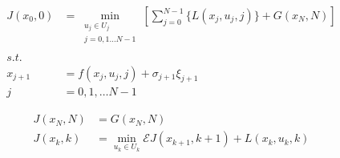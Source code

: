 \documentclass[varwidth]{standalone}
\begin{document}
\begin{minipage}{\linewidth}
    \begin{align}
        J(x_0, 0) &= \min_{
            \substack{
                u_j \in U_j \\
                j = 0, 1 \dots N-1 \\
            }
        }
        \left[ \sum_{j=0}^{N-1} \{L(x_j, u_j, j)\} + G(x_N, N)\right] \nonumber\\
        s.t. &{} \\
        x_{j+1} &= f(x_j, u_j, j) + \sigma_{j+1}\xi_{j+1} \nonumber\\
        j &= 0, 1, \dots N-1 \nonumber
    \end{align}
\end{minipage}

\begin{minipage}{\linewidth}
    \begin{align}
        J(x_N, N) &= G(x_N, N)  \\
        J(x_k, k) &= \min_{u_k \in U_k} \mathcal{E} J(x_{k+1}, k+1) + L(x_k, u_k, k)
    \end{align}
\end{minipage}
\end{document}
